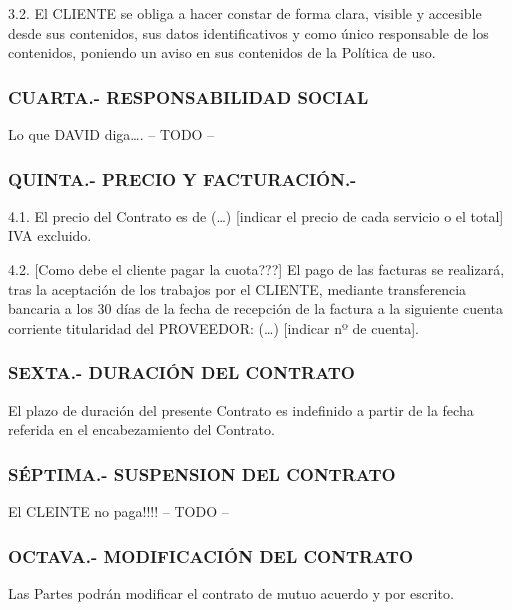 \documentclass['12pt',spanish,a4paper,]{article}
\begin{document}
3.2. El CLIENTE se obliga a hacer constar de forma clara, visible y
accesible desde sus contenidos, sus datos identificativos y como único
responsable de los contenidos, poniendo un aviso en sus contenidos de la
Política de uso.

\subsubsection{CUARTA.- RESPONSABILIDAD
SOCIAL}\label{cuarta.--responsabilidad-social}

Lo que DAVID diga\ldots{}. -- TODO --

\subsubsection{QUINTA.- PRECIO Y
FACTURACIÓN.-}\label{quinta.--precio-y-facturaciuxf3n.-}

4.1. El precio del Contrato es de (\ldots{}) {[}indicar el precio de
cada servicio o el total{]} IVA excluido.

4.2. {[}Como debe el cliente pagar la cuota???{]} El pago de las
facturas se realizará, tras la aceptación de los trabajos por el
CLIENTE, mediante transferencia bancaria a los 30 días de la fecha de
recepción de la factura a la siguiente cuenta corriente titularidad del
PROVEEDOR: (\ldots{}) {[}indicar nº de cuenta{]}.

\subsubsection{SEXTA.- DURACIÓN DEL
CONTRATO}\label{sexta.--duraciuxf3n-del-contrato}

El plazo de duración del presente Contrato es indefinido a partir de la
fecha referida en el encabezamiento del Contrato.

\subsubsection{SÉPTIMA.- SUSPENSION DEL
CONTRATO}\label{suxe9ptima.--suspension-del-contrato}

El CLEINTE no paga!!!! -- TODO --

\subsubsection{OCTAVA.- MODIFICACIÓN DEL
CONTRATO}\label{octava.--modificaciuxf3n-del-contrato}

Las Partes podrán modificar el contrato de mutuo acuerdo y por escrito.
\end{document}
